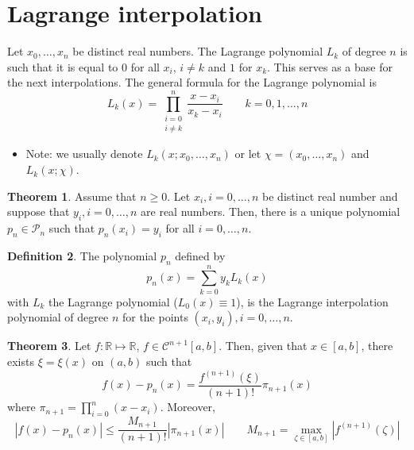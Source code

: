 \documentclass[12pt, openany]{report}
\newcommand{\R}{\mathbb{R}}
\theoremstyle{definition}
\newtheorem{thm}{Theorem}[chapter]
\newtheorem{definition}[thm]{Definition}
\begin{document}
\section{Lagrange interpolation}
Let \(x_0,\dots,x_n\) be distinct real numbers. The Lagrange polynomial \(L_k\) of degree \(n\) is such that it is equal to 0 for all \(x_i\), \(i\neq k\) and \(1\) for \(x_k\). This serves as a base for the next interpolations. The general formula for the Lagrange polynomial is 
\begin{equation}
    L_k(x) = \prod_{\substack{i=0\\ i\neq k}}^n \frac{x-x_i}{x_k-x_i}\qquad k=0,1,\dots,n
\end{equation}
\begin{itemize}
    \item Note: we usually denote \(L_k(x;x_0,\dots,x_n)\) or let \(\chi = (x_0,\dots,x_n)\) and \(L_k(x;\chi)\). 
\end{itemize}
\begin{thm}
    Assume that $n\ge 0$. Let $x_i,i=0,\dots,n$ be distinct real number and suppose that $y_i,i=0,\dots,n$ are real numbers. Then, there is a unique polynomial $p_n\in \mathcal{P}_n$ such that $p_n(x_i)=y_i$ for all $i=0,\dots,n$.
\end{thm}
\begin{definition}
    The polynomial $p_n$ defined by 
    \begin{equation}\label{eq:lagrange}
        p_n(x) = \sum_{k=0}^n y_kL_k(x)
    \end{equation}
    with $L_k$ the Lagrange polynomial ($L_0(x) \equiv 1$), is the Lagrange interpolation polynomial of degree $n$ for the points $(x_i,y_i),i=0,\dots,n$.
\end{definition}
\begin{thm}
    Let $f:\R\mapsto \R$, $f\in \mathcal{C}^{n+1}[a,b]$. Then, given that $x\in[a,b]$, there exists $\xi=\xi(x)$ on $(a,b)$ such that 
    \begin{equation}
        f(x)-p_n(x) = \frac{f^{(n+1)}(\xi)}{(n+1)!}\pi_{n+1}(x)
    \end{equation}
    where $\pi_{n+1} = \prod_{i=0}^n(x-x_i)$. Moreover, 
    \begin{equation}
        |f(x)-p_n(x)| \le \frac{M_{n+1}}{(n+1)!}|\pi_{n+1}(x)| \qquad M_{n+1} = \max_{\zeta \in [a,b]}|f^{(n+1)}(\zeta)|
    \end{equation}
\end{thm}
\end{document}
